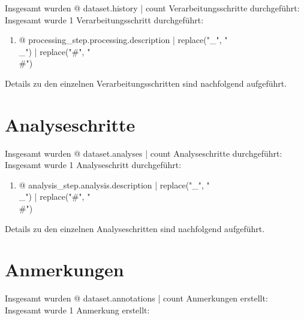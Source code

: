 Insgesamt wurden {@ dataset.history | count } Verarbeitungsschritte durchgeführt:
Insgesamt wurde 1 Verarbeitungsschritt durchgeführt:

\begin{enumerate}
\item {@ processing_step.processing.description | replace("_", "\\_") | replace("#", "\\#") }
\end{enumerate}


Details zu den einzelnen Verarbeitungsschritten sind nachfolgend aufgeführt.




\section{Analyseschritte}

Insgesamt wurden {@ dataset.analyses | count } Analyseschritte durchgeführt:
Insgesamt wurde 1 Analyseschritt durchgeführt:

\begin{enumerate}
\item {@ analysis_step.analysis.description | replace("_", "\\_") | replace("#", "\\#") }
\end{enumerate}

Details zu den einzelnen Analyseschritten sind nachfolgend aufgeführt.




\section{Anmerkungen}

Insgesamt wurden {@ dataset.annotations | count } Anmerkungen erstellt:
Insgesamt wurde 1 Anmerkung erstellt:

